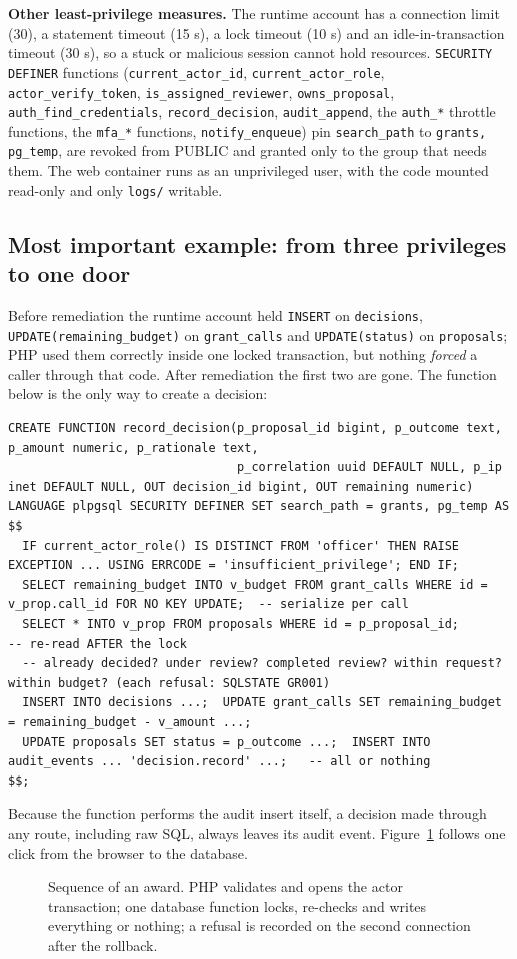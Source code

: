 \documentclass[10pt,a4paper]{article}
\newcommand{\code}[1]{\nolinkurl{#1}}
\newcommand{\diagram}[3]{\begin{figure}[!htbp]\centering\adjustbox{max width=\linewidth,max height=6.6cm}{}\caption{#2}\label{fig:#3}\end{figure}}
\begin{document}
\textbf{Other least-privilege measures.} The runtime account has a connection limit (30), a statement timeout (15 s), a lock timeout (10 s) and an idle-in-transaction timeout (30 s), so a stuck or malicious session cannot hold resources. \code{SECURITY DEFINER} functions (\code{current_actor_id}, \code{current_actor_role}, \code{actor_verify_token}, \code{is_assigned_reviewer}, \code{owns_proposal}, \code{auth_find_credentials}, \code{record_decision}, \code{audit_append}, the \code{auth_*} throttle functions, the \code{mfa_*} functions, \code{notify_enqueue}) pin \code{search_path} to \code{grants, pg_temp}, are revoked from PUBLIC and granted only to the group that needs them. The web container runs as an unprivileged user, with the code mounted read-only and only \code{logs/} writable.

\subsection{Most important example: from three privileges to one door}
Before remediation the runtime account held \code{INSERT} on \code{decisions}, \code{UPDATE(remaining\_budget)} on \code{grant_calls} and \code{UPDATE(status)} on \code{proposals}; PHP used them correctly inside one locked transaction, but nothing \emph{forced} a caller through that code. After remediation the first two are gone. The function below is the only way to create a decision:
\begin{lstlisting}[language=SQLx,caption={database/05\_remediation.sql: record\_decision() (condensed)}]
CREATE FUNCTION record_decision(p_proposal_id bigint, p_outcome text, p_amount numeric, p_rationale text,
                                p_correlation uuid DEFAULT NULL, p_ip inet DEFAULT NULL, OUT decision_id bigint, OUT remaining numeric)
LANGUAGE plpgsql SECURITY DEFINER SET search_path = grants, pg_temp AS $$
  IF current_actor_role() IS DISTINCT FROM 'officer' THEN RAISE EXCEPTION ... USING ERRCODE = 'insufficient_privilege'; END IF;
  SELECT remaining_budget INTO v_budget FROM grant_calls WHERE id = v_prop.call_id FOR NO KEY UPDATE;  -- serialize per call
  SELECT * INTO v_prop FROM proposals WHERE id = p_proposal_id;                 -- re-read AFTER the lock
  -- already decided? under review? completed review? within request? within budget? (each refusal: SQLSTATE GR001)
  INSERT INTO decisions ...;  UPDATE grant_calls SET remaining_budget = remaining_budget - v_amount ...;
  UPDATE proposals SET status = p_outcome ...;  INSERT INTO audit_events ... 'decision.record' ...;   -- all or nothing
$$;
\end{lstlisting}
Because the function performs the audit insert itself, a decision made through any route, including raw SQL, always leaves its audit event. Figure~\ref{fig:award} follows one click from the browser to the database.
\diagram{award}{Sequence of an award. PHP validates and opens the actor transaction; one database function locks, re-checks and writes everything or nothing; a refusal is recorded on the second connection after the rollback.}{award}
\end{document}

